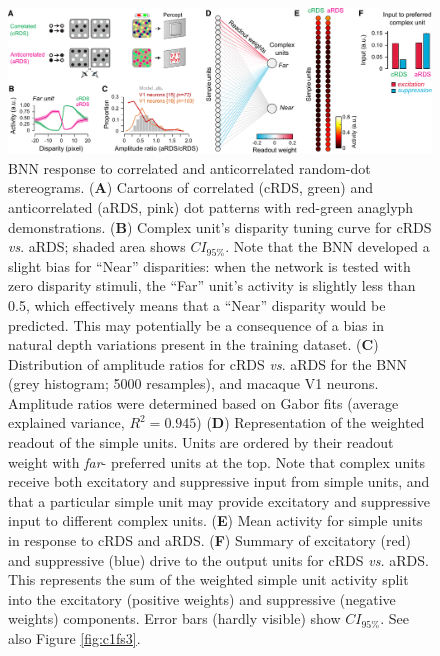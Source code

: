 {\begin{figure}[!h]
  \centering
  \includegraphics[width=14cm,keepaspectratio]{chapter1/chapter1-figs/Fig3.pdf}
  \caption[ BNN response to correlated and anticorrelated random-dot stereograms.]{ BNN response to correlated and anticorrelated random-dot stereograms. ({\bf A}) Cartoons of correlated (cRDS, green) and anticorrelated (aRDS, pink) dot patterns with red-green anaglyph demonstrations. ({\bf B}) Complex unit's disparity tuning curve for cRDS {\it vs}. aRDS; shaded area shows $CI_{95\%}$. Note that the BNN developed a slight bias for ``Near'' disparities: when the network is tested with zero disparity stimuli, the ``Far'' unit's activity is slightly less than 0.5, which effectively means that a ``Near'' disparity would be predicted. This may potentially be a consequence of a bias in natural depth variations present in the training dataset. ({\bf C}) Distribution of amplitude ratios for cRDS {\it vs}. aRDS for the BNN (grey histogram; 5000 resamples), and macaque V1 neurons. Amplitude ratios were determined based on Gabor fits (average explained variance, $R^2=0.945$) ({\bf D}) Representation of the weighted readout of the simple units. Units are ordered by their readout weight with {\it far}- preferred units at the top. Note that complex units receive both excitatory and suppressive input from simple units, and that a particular simple unit may provide excitatory and suppressive input to different complex units. ({\bf E}) Mean activity for simple units in response to cRDS and aRDS. ({\bf F}) Summary of excitatory (red) and suppressive (blue) drive to the output units for cRDS {\it vs.} aRDS. This represents the sum of the weighted simple unit activity split into the excitatory (positive weights) and suppressive (negative weights) components. Error bars (hardly visible) show $CI_{95\%}$. See also Figure \ref{fig:c1fs3}.}
  \label{fig:c1f3}
\end{figure}


}
